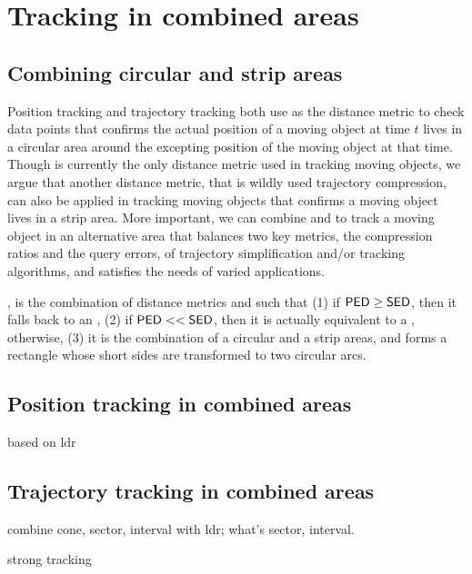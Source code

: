 

\section{Tracking in combined areas}
\label{sec:combine}


\subsection{Combining circular and strip areas}
Position tracking and trajectory tracking both use \sed as the distance metric to check data points that confirms the actual position of a moving object at time $t$ lives in a circular area around the excepting position of the moving object at that time.
Though \sed is currently the only distance metric used in tracking moving objects, we argue that another distance metric, \ped that is wildly used trajectory compression, can also be applied in tracking moving objects that confirms a moving object lives in a strip area. More important, we can combine \sed and \ped to track a moving object in an alternative area that balances two key metrics, \ie the compression ratios and the query errors, of trajectory simplification and/or tracking algorithms, and satisfies the needs of varied applications.


, is the combination of distance metrics \sed and \ped such that (1) if ${\mathsf{PED}} \ge {\ensuremath {\mathsf{SED}}}$, then it falls back to an \sed, (2) if ${\mathsf{PED}} << {\mathsf{SED}}$, then it is actually equivalent to a \ped, otherwise, (3) it is the combination of a circular and a strip areas, and forms a rectangle whose short sides are transformed to two circular arcs.



\subsection{Position tracking in combined areas}
based on ldr


\subsection{Trajectory tracking in combined areas}

combine cone, sector, interval with ldr; what's sector, interval.


strong tracking

